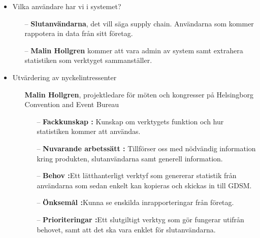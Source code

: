 \documentclass{article}
\begin{document}
    \begin{itemize}
        \item Vilka användare har vi i systemet?
            \begin{itemize}
                \item [--] \textbf{Slutanvändarna}, det vill säga supply chain. Användarna som kommer rappotera in data från sitt företag. 
                \item[--] \textbf{Malin Hollgren} kommer att vara admin av system samt extrahera statistiken som verktyget sammanställer. 
            \end{itemize}
        \item Utvärdering av nyckelintressenter
            \begin{itemize}
                \item [] \textbf{Malin Hollgren}, projektledare för möten och kongresser på Helsingborg Convention and Event Bureau
                    \begin{itemize}
                        \item[--] \textbf{Fackkunskap :} Kunskap om verktygets funktion och hur statistiken kommer att användas.
                        \\
                        \item[--] \textbf{Nuvarande arbetssätt :} Tillförser oss med nödvändig information kring produkten, slutanvändarna samt generell information.
                        \\
                        \item[--] \textbf{Behov :}Ett lätthanterligt verktyf som genererar statistik från användarna som sedan enkelt kan kopieras och skickas in till GDSM.
                        \\
                        \item[--] \textbf{Önksemål :}Kunna se enskilda inrapporteringar från företag.
                        \\
                        \item[--] \textbf{Prioriteringar :}Ett slutgiltigt verktyg som gör fungerar utifrån behovet, samt att det ska vara enklet för slutanvändarna.
                        \\
                    \end{itemize}
           

\end{itemize}
\end{itemize}
\end{document}

